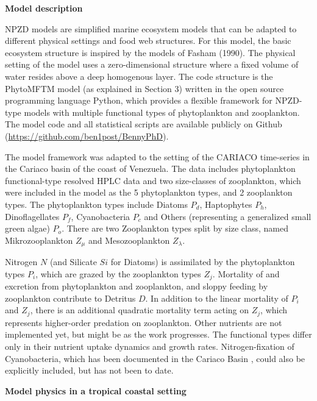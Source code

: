 {\bf {Model description}} 

NPZD models are simplified marine ecosystem models
 that can be adapted to different physical settings and food web structures. For this model, the basic ecosystem structure is inspired by the models of Fasham (1990). The physical setting of the model uses a zero-dimensional structure where a fixed volume of water resides above a deep homogenous layer. The code structure is the PhytoMFTM model (as explained in Section 3)
 written in the open source programming language Python, which provides a flexible framework for NPZD-type models with multiple functional types of phytoplankton and zooplankton. The model code and all statistical scripts are available publicly on Github (\url{https://github.com/ben1post/BennyPhD}).

The model framework was adapted to the setting of the CARIACO time-series in the Cariaco basin of the coast of Venezuela. The data includes phytoplankton functional-type resolved HPLC data 
and two size-classes of zooplankton, which were included in the model as the 5 phytoplankton types, and 2 zooplankton types. The phytoplankton types include Diatoms $P_{d}$, Haptophytes $P_{h}$, Dinoflagellates $P_{f}$, Cyanobacteria $P_{c}$ and Others (representing a generalized small green algae) $P_{o}$. There are two Zooplankton types split by size class, named Mikrozooplankton $Z_{\mu}$ and Mesozooplankton $Z_{\lambda}$. 

Nitrogen $N$ (and Silicate $Si$ for Diatoms) is assimilated by the phytoplankton types $P_i$, which are grazed by the zooplankton types $Z_j$. Mortality of and excretion from phytoplankton and zooplankton, and sloppy feeding by zooplankton contribute to Detritus $D$. In addition to the linear mortality of $P_i$ and $Z_j$, there is an additional quadratic mortality term acting on $Z_j$, which represents higher-order predation on zooplankton. Other nutrients are not implemented yet, but might be as the work progresses. The functional types 
differ only in their nutrient uptake dynamics and growth rates.
 Nitrogen-fixation of Cyanobacteria, which has been documented in the Cariaco Basin \citep{Montes2013}, could also be explicitly included, but has not been to date. 

{\textbf{Model physics in a tropical coastal setting}}


